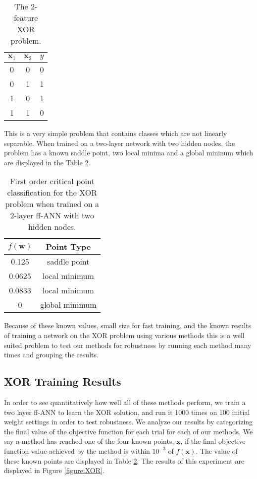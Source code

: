 \documentclass[letterpaper,12pt,titlepage,oneside,final]{book}
\begin{document}
	\begin{table}[h] 
		\centering 
		\begin{tabular}{ |c|c||c| } 
			\hline 
			$\mathbf{x}_{1}$ & $\mathbf{x}_{2}$ & $y$\\ 
			\hline
			\hline
			0 & 0 & 0\\ 
			\hline 
			0 & 1 & 1\\ 
			\hline 
			1 & 0 & 1\\ 
			\hline 
			1 & 1 & 0\\ 
			\hline 
		\end{tabular} 
		\caption{The 2-feature XOR problem.} \label{table:XOR} \end{table}
	
	This is a very simple problem that contains classes which are not linearly separable. When trained on a two-layer network with two hidden nodes, the problem has a known saddle point, two local minima and a global mininum which are displayed in the Table \ref{table:XOR_point_type}.
	
	\begin{table}[h] 
		\centering 
		\begin{tabular}{ |c|c| } 
			\hline 
			$f(\mathbf{w})$ & \textbf{Point Type}\\ 
			\hline
			0.125 & saddle point\\  
			0.0625 & local minimum\\ 
			0.0833 & local minimum\\ 
			0 & global minimum\\ 
			\hline 
		\end{tabular} 
		\caption{First order critical point classification for the XOR problem when trained on a 2-layer ff-ANN with two hidden nodes.} \label{table:XOR_point_type} \end{table}
	
	Because of these known values, small size for fast training, and the known results of training a network on the XOR problem using various methods this is a well suited problem to test our methods for robustness by running each method many times and grouping the results. 
	
	\subsection{XOR Training Results}
	
	In order to see quantitatively how well all of these methods perform, we train a two layer ff-ANN to learn the XOR solution, and run it 1000 times on 100 initial weight settings in order to test robustness. We analyze our results by categorizing the final value of the objective function for each trial for each of our methods. We say a method has reached one of the four known points, $\mathbf{x}$, if the final objective function value achieved by the method is within $10^{-3}$ of $f(\mathbf{x})$. The value of these known points are displayed in Table \ref{table:XOR_point_type}. The results of this experiment are displayed in Figure \ref{figure:XOR}.
	
\end{document}
